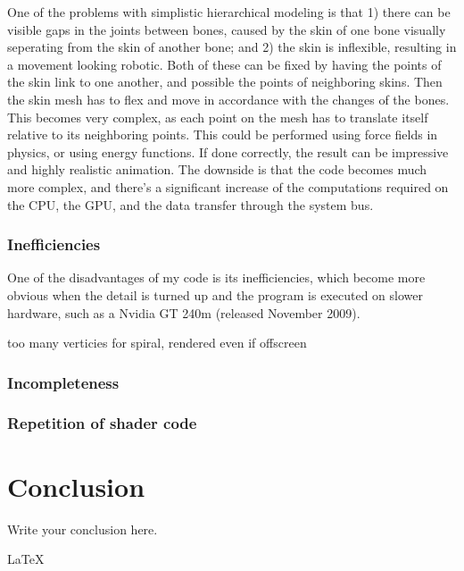 \documentclass[journal]{IEEEtran}
\begin{document}
One of the problems with simplistic hierarchical modeling is that 1) there can be visible gaps in the joints between bones,  caused by the skin of one bone visually seperating from the skin of another bone; and 2) the skin is inflexible, resulting in a movement looking robotic. Both of these can be fixed by having the points of the skin link to one another, and possible the points of neighboring skins. Then the skin mesh has to flex and move in accordance with the changes of the bones. This becomes very complex, as each point on the mesh has to translate itself relative to its neighboring points. This could be performed using force fields in physics, or using energy functions. If done correctly, the result can be impressive and highly realistic animation. The downside is that the code becomes much more complex, and there's a significant increase of the computations required on the CPU, the GPU, and the data transfer through the system bus.

\subsubsection{Inefficiencies}

One of the disadvantages of my code is its inefficiencies, which become more obvious when the detail is turned up and the program is executed on slower hardware, such as a Nvidia GT 240m (released November 2009).

too many verticies for spiral, rendered even if offscreen

\subsubsection{Incompleteness}



\subsubsection{Repetition of shader code}



\section{Conclusion}
Write your conclusion here.

\LaTeX{}
\end{document}
